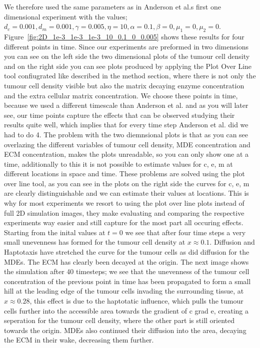 We therefore used the same parameters as in Anderson et al.s first one dimensional experiment with the values; $d_c = 0.001, d_m = 0.001, \gamma = 0.005, \eta = 10, \alpha = 0.1, \beta = 0, \mu_1 = 0, \mu_2 = 0$. Figure~\ref{fig:2D_1e-3_1e-3_1e-3_10_0.1_0_0.005} shows these results for four different points in time. Since our experiments are preformed in two dimensions you can see on the left side the two dimensional plots of the tumour cell density and on the right side you can see plots produced by applying the Plot Over Line tool confiugrated like described in the method section, where there is not only the tumour cell density visible but also the matrix decaying enzyme concentration and the extra cellular matrix concentration. We choose these points in time, because we used a different timescale than Anderson et al. and as you will later see, our time points capture the effects that can be observed studying their results quite well, which implies that for every time step Anderson et al. did we had to do 4. The problem with the two diemnsional plots is that as you can see overlazing the different variables of tumour cell density, MDE concentration and ECM concentration, makes the plots unreadable, so you can only show one at a time, additionally to this it is not possible to estimate values for c, e, m at different locations in space and time. These problems are solved using the plot over line tool, as you can see in the plots on the right side the curves for c, e, m are clearly distinguishable and we can estimate their values at locations. This is why for most experiments we resort to using the plot over line plots instead of full 2D simulation images, they make evaluating and comparing the respective experiments way easier and still capture for the most part all occuring effects. 
Starting from the inital values at $t=0$ we see that after four time steps a very small unevenness has formed for the tumour cell density at $x\approx 0.1$. Diffusion and Haptotaxis have stretched the curve for the tumour cells as did diffusion for the MDEs. The ECM has clearly been decayed at the origin.
The next image shows the simulation after 40 timesteps; we see that the unevenness of the tumour cell concentration of the previous point in time has been propagated to form a small hill at the leading edge of the tumour cells invading the surrounding tissue, at $x\approx 0.28$, this effect is due to the haptotatic influence, which pulls the tumour cells further into the accessible area towards the gradient of c grad e, creating a seperation for the tumour cell density, where the other part is still oriented towards the origin. MDEs also continued their diffusion into the area, decaying the ECM in their wake, decreasing them further. 
